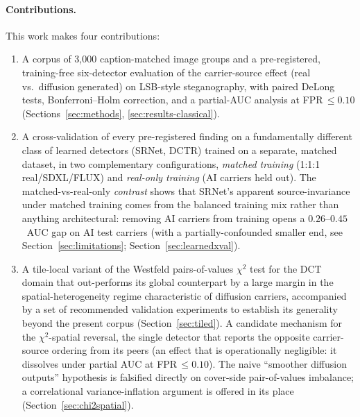 \documentclass[10pt,twocolumn,a4paper]{article}
\begin{document}
\paragraph{Contributions.} This work makes four contributions:
\begin{enumerate}
\item A corpus of 3{,}000 caption-matched image groups and a pre-registered, training-free six-detector evaluation of the carrier-source effect (real vs.\ diffusion generated) on LSB-style steganography, with paired DeLong tests, Bonferroni--Holm correction, and a partial-AUC analysis at FPR\,$\leq\!0.10$ (Sections~\ref{sec:methods}, \ref{sec:results-classical}).
\item A cross-validation of every pre-registered finding on a fundamentally different class of learned detectors (SRNet, DCTR) trained on a separate, matched dataset, in two complementary configurations, \textit{matched training} (1:1:1 real/SDXL/FLUX) and \textit{real-only training} (AI carriers held out). The matched-vs-real-only \emph{contrast} shows that SRNet's apparent source-invariance under matched training comes from the balanced training mix rather than anything architectural: removing AI carriers from training opens a $0.26$--$0.45$~AUC gap on AI test carriers (with a partially-confounded smaller end, see Section~\ref{sec:limitations}; Section~\ref{sec:learnedxval}).
\item A tile-local variant of the Westfeld pairs-of-values $\chi^2$ test for the DCT domain that out-performs its global counterpart by a large margin in the spatial-heterogeneity regime characteristic of diffusion carriers, accompanied by a set of recommended validation experiments to establish its generality beyond the present corpus (Section~\ref{sec:tiled}).
A candidate mechanism for the $\chi^2$-spatial reversal, the single detector that reports the opposite carrier-source ordering from its peers (an effect that is operationally negligible: it dissolves under partial AUC at FPR\,$\leq\!0.10$). The naive ``smoother diffusion outputs'' hypothesis is falsified directly on cover-side pair-of-values imbalance; a correlational variance-inflation argument is offered in its place (Section~\ref{sec:chi2spatial}).
\end{enumerate}
\end{document}
